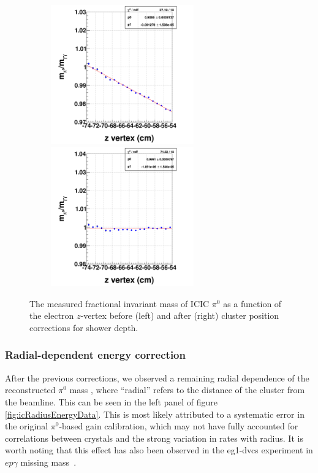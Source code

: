 \begin{figure}[tbp]
\centering
\includegraphics[width=8cm,height=6cm]{fig_analysis/NoDepthRunRadialE_finvMass_vz_pi0.png}
\includegraphics[width=8cm,height=6cm]{fig_analysis/NewDepthRunRadialE_finvMass_vz_pi0.png}
\caption{The measured fractional invariant mass of ICIC $\pi^{0}$ as a function of the electron $z$-vertex before (left) and after (right) cluster position corrections for shower depth.} 
\label{fig:ic_exp_correction_inv_mass_comp}
\end{figure}

\subsubsection{Radial-dependent energy correction}\label{sec:icraddepecorr}

After the previous corrections, we observed a remaining radial dependence of the reconstructed $\pi^{0}$ mass \cite{cristina}, where ``radial'' refers to the distance of the cluster from the beamline.  This can be seen in the left panel of figure \ref{fig:icRadiusEnergyData}.  
This is most likely attributed to a systematic error in the original $\pi^0$-based gain calibration, which may not have fully accounted for correlations between crystals and the strong variation in rates with radius.  It is worth noting that this effect has also been observed in the eg1-dvcs experiment in $ep\gamma$ missing mass~\cite{eg1dvcs_photonenergy}.

